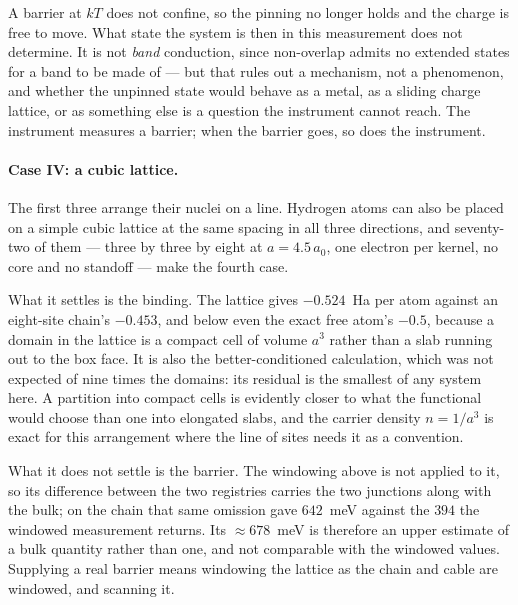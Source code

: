 A barrier at $kT$ does not confine, so the pinning no longer holds and the charge is free to move.
What state the system is then in this measurement does not determine. It is not \emph{band}
conduction, since non-overlap admits no extended states for a band to be made of --- but that rules
out a mechanism, not a phenomenon, and whether the unpinned state would behave as a metal, as a
sliding charge lattice, or as something else is a question the instrument cannot reach. The
instrument measures a barrier; when the barrier goes, so does the instrument.

\paragraph{Case IV: a cubic lattice.}
The first three arrange their nuclei on a line. Hydrogen atoms can also be placed on a simple cubic
lattice at the same spacing in all three directions, and seventy-two of them --- three by three by
eight at $a=4.5\,a_0$, one electron per kernel, no core and no standoff --- make the fourth case.

What it settles is the binding. The lattice gives $-0.524$~Ha per atom against an eight-site chain's
$-0.453$, and below even the exact free atom's $-0.5$, because a domain in the lattice is a compact
cell of volume $a^3$ rather than a slab running out to the box face. It is also the
better-conditioned calculation, which was not expected of nine times the domains: its residual is
the smallest of any system here. A partition into compact cells is evidently closer to what the
functional would choose than one into elongated slabs, and the carrier density $n=1/a^3$ is exact
for this arrangement where the line of sites needs it as a convention.

What it does not settle is the barrier. The windowing above is not applied to it, so its difference
between the two registries carries the two junctions along with the bulk; on the chain that same
omission gave $642$~meV against the $394$ the windowed measurement returns. Its ${\approx}678$~meV
is therefore an upper estimate of a bulk quantity rather than one, and not comparable with the
windowed values. Supplying a real barrier means windowing the lattice as the chain and cable are
windowed, and scanning it.

